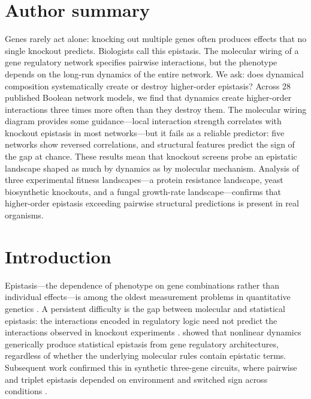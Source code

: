 \documentclass[10pt]{article}
\begin{document}
\section*{Author summary}
Genes rarely act alone: knocking out multiple genes often produces
effects that no single knockout predicts. Biologists call this epistasis.
The molecular wiring of a gene regulatory network specifies pairwise
interactions, but the phenotype depends on the long-run dynamics of the
entire network. We ask: does dynamical composition systematically create
or destroy higher-order epistasis? Across 28 published Boolean network
models, we find that dynamics create higher-order interactions three
times more often than they destroy them. The molecular wiring diagram
provides some guidance---local interaction strength correlates with
knockout epistasis in most networks---but it fails as a reliable
predictor: five networks show reversed correlations, and structural
features predict the sign of the gap at chance. These results mean
that knockout screens probe an epistatic landscape shaped as much by
dynamics as by molecular mechanism. Analysis of three experimental
fitness landscapes---a protein resistance landscape, yeast
biosynthetic knockouts, and a fungal growth-rate landscape---confirms
that higher-order epistasis exceeding pairwise structural predictions
is present in real organisms.


\section{Introduction}
\label{sec:intro}

Epistasis---the dependence of phenotype on gene combinations rather
than individual effects---is among the oldest measurement problems in
quantitative genetics \citep{fisher1918correlation, bateson1909heredity}. A
persistent difficulty is the gap between molecular and statistical
epistasis: the interactions encoded in regulatory logic need not
predict the interactions observed in knockout experiments
\citep{phillips2008epistasis}. \citet{gjuvsland2007statistical} showed
that nonlinear dynamics generically produce statistical epistasis from
gene regulatory architectures, regardless of whether the underlying
molecular rules contain epistatic terms. Subsequent work confirmed this in synthetic three-gene
circuits, where pairwise and triplet epistasis depended on environment
and switched sign across conditions \citep{baier2023environment}.
\end{document}
